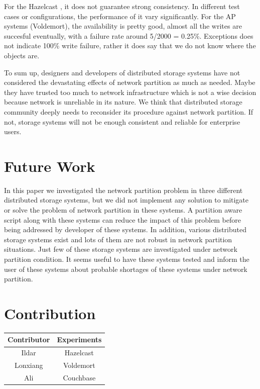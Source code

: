 \documentclass[a4paper]{article}
\begin{document}
For the Hazelcast , it does not guarantee strong consistency. In different test cases or configurations, the performance of it
vary significantly.
For the AP systems (Voldemort), the availability is pretty good, almost all the writes are succesful eventually, with a failure rate around 5/2000 = 0.25\%.
Exceptions does not indicate 100\% write failure, rather it does say that we do not know where the objects are.

To sum up, designers and developers of distributed storage systems have not considered the devastating effects of network partition as much as needed.
Maybe they have trusted too much to network infrastructure which is not a wise decision because network is unreliable in its nature.
We think that distributed storage community deeply needs to reconsider its procedure against network partition.
If not, storage systems will not be enough consistent and reliable for enterprise users.


\section{Future Work}
In this paper we investigated the network partition problem in three different distributed storage systems, but we did not implement any solution to mitigate or solve the problem of network partition in these systems. 
A partition aware script along with these systems can reduce the impact of this problem before being addressed by developer of these systems.
In addition, various distributed storage systems exist and lots of them are not robust in network partition situations.
Just few of these storage systems are investigated under network partition condition.
It seems useful to have these systems tested and inform the user of these systems about probable shortages of these systems under network partition.


\section*{Contribution}

\begin{table}[h]
	\centering
	\begin{tabular}{|c|c|}
		\hline
		\rowcolor{light-gray} \textbf{Contributor} & \textbf{Experiments} \\ \hline
		Ildar & Hazelcast  \\ \hline
		Lonxiang & Voldemort  \\ \hline
		Ali & Couchbase  \\ \hline
	\end{tabular}
\end{table}

\printbibliography
\end{document}
